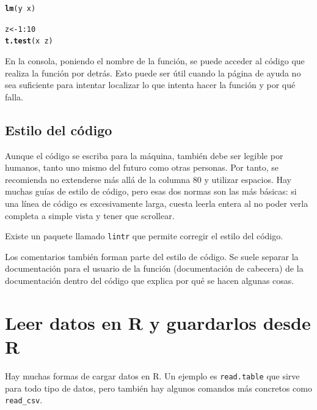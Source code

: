 \documentclass{config/apuntes}\usepackage[]{graphicx}\usepackage[]{xcolor}
\makeatletter
\newcommand{\hlnum}[1]{\textcolor[rgb]{0.686,0.059,0.569}{#1}}%
\newcommand{\hlopt}[1]{\textcolor[rgb]{0,0,0}{#1}}%
\newcommand{\hldef}[1]{\textcolor[rgb]{0.345,0.345,0.345}{#1}}%
\newcommand{\hlkwb}[1]{\textcolor[rgb]{0.69,0.353,0.396}{#1}}%
\newcommand{\hlkwd}[1]{\textcolor[rgb]{0.737,0.353,0.396}{\textbf{#1}}}%
\newenvironment{kframe}{%
 \def\at@end@of@kframe{}%
 \ifinner\ifhmode%
  \def\at@end@of@kframe{\end{minipage}}%
  \begin{minipage}{\columnwidth}%
 \fi\fi%
 \def\FrameCommand##1{\hskip\@totalleftmargin \hskip-\fboxsep
 \colorbox{shadecolor}{##1}\hskip-\fboxsep
     \hskip-\linewidth \hskip-\@totalleftmargin \hskip\columnwidth}%
 \MakeFramed {\advance\hsize-\width
   \@totalleftmargin\z@ \linewidth\hsize
   \@setminipage}}%
 {\par\unskip\endMakeFramed%
 \at@end@of@kframe}
\newenvironment{knitrout}{}{} %
\newcommand{\code}[1]{\texttt{#1}}
\makeatother
\begin{document}
\begin{knitrout}
\begin{kframe}
{\ttfamily\noindent\bfseries\color{errorcolor}{\#\# Error in xy.coords(x, y, xlabel, ylabel, log): 'x' and 'y' lengths differ}}\begin{alltt}
\hlkwd{lm}\hldef{(y} \hlopt{~} \hldef{x)}
\end{alltt}


{\ttfamily\noindent\bfseries{}}\begin{alltt}
\hldef{z} \hlkwb{<-} \hlnum{1}\hlopt{:}\hlnum{10}
\hlkwd{t.test}\hldef{(x} \hlopt{~} \hldef{z)}
\end{alltt}


{\ttfamily\noindent\bfseries{}}\end{kframe}
\end{knitrout}

En la consola, poniendo el nombre de la función, se puede acceder al código que realiza la función por detrás. Esto puede ser útil cuando la página de ayuda no sea suficiente para intentar localizar lo que intenta hacer la función y por qué falla.

\subsection{Estilo del código}
Aunque el código se escriba para la máquina, también debe ser legible por humanos, tanto uno mismo del futuro como otras personas. Por tanto, se recomienda no extenderse más allá de la columna 80 y utilizar espacios. Hay muchas guías de estilo de código, pero esas dos normas son las más básicas: si una línea de código es excesivamente larga, cuesta leerla entera al no poder verla completa a simple vista y tener que scrollear. 

Existe un paquete llamado \code{lintr} que permite corregir el estilo del código. 

Los comentarios también forman parte del estilo de código. Se suele separar la documentación para el usuario de la función (documentación de cabecera) de la documentación dentro del código que explica por qué se hacen algunas cosas.

\section{Leer datos en R y guardarlos desde R}
Hay muchas formas de cargar datos en R. Un ejemplo es \code{read.table} que sirve para todo tipo de datos, pero también hay algunos comandos más concretos como \code{read\_csv}.
\end{document}
